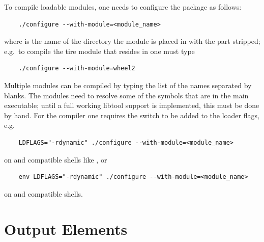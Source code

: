 \noindent
To compile loadable modules, one needs to configure
the package as follows:
\begin{verbatim}
    ./configure --with-module=<module_name>
\end{verbatim}
where  is the name of the directory the module
is placed in with the  part stripped; e.g.\ to compile
the tire module that resides in  
one must type
\begin{verbatim}
    ./configure --with-module=wheel2
\end{verbatim}
Multiple modules can be compiled by typing the list of the names
separated by blanks.
The modules need to resolve some of the symbols that are in the
main executable; until a full working libtool support is implemented,
this must be done by hand.
For the  compiler one requires the switch  
to be added to the loader flags, e.g.
\begin{verbatim}
    LDFLAGS="-rdynamic" ./configure --with-module=<module_name>
\end{verbatim}
on  and compatible shells like , or
\begin{verbatim}
    env LDFLAGS="-rdynamic" ./configure --with-module=<module_name>
\end{verbatim}
on  and compatible shells.





\section{Output Elements}

